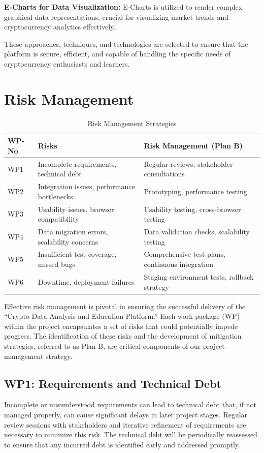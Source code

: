 \documentclass[12pt]{report}
\begin{document}
\textbf{E-Charts for Data Visualization:} E-Charts is utilized to render complex graphical data representations, crucial for visualizing market trends and cryptocurrency analytics effectively.

These approaches, techniques, and technologies are selected to ensure that the platform is secure, efficient, and capable of handling the specific needs of cryptocurrency enthusiasts and learners.

\section{Risk Management}
\begin{table}[h]
\centering
\begin{tabular}{|l|p{6cm}|p{5cm}|}
\hline
\textbf{WP-No} & \textbf{Risks}                                 & \textbf{Risk Management (Plan B)}          \\ \hline
WP1            & Incomplete requirements, technical debt         & Regular reviews, stakeholder consultations \\ \hline
WP2            & Integration issues, performance bottlenecks     & Prototyping, performance testing           \\ \hline
WP3            & Usability issues, browser compatibility         & Usability testing, cross-browser testing   \\ \hline
WP4            & Data migration errors, scalability concerns     & Data validation checks, scalability testing\\ \hline
WP5            & Insufficient test coverage, missed bugs         & Comprehensive test plans, continuous integration \\ \hline
WP6            & Downtime, deployment failures                  & Staging environment tests, rollback strategy \\ \hline
\end{tabular}
\caption{Risk Management Strategies}
\label{table:risk_managementand}
\end{table}

Effective risk management is pivotal in ensuring the successful delivery of the ``Crypto Data Analysis and Education Platform.'' Each work package (WP) within the project encapsulates a set of risks that could potentially impede progress. The identification of these risks and the development of mitigation strategies, referred to as Plan B, are critical components of our project management strategy.

\subsection{WP1: Requirements and Technical Debt}
Incomplete or misunderstood requirements can lead to technical debt that, if not managed properly, can cause significant delays in later project stages. Regular review sessions with stakeholders and iterative refinement of requirements are necessary to minimize this risk. The technical debt will be periodically reassessed to ensure that any incurred debt is identified early and addressed promptly.
\end{document}

